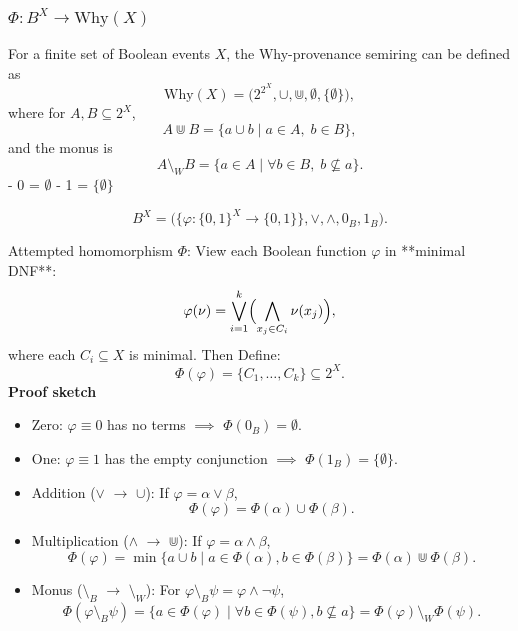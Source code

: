 \subsubsection{\(\Phi : B^X \to \mathrm{Why}(X)\)}

For a finite set of Boolean events \(X\), the Why-provenance semiring can be defined as
\[
\mathrm{Why}(X) = \bigl(2^{2^X},\cup,\Cup,\emptyset,\{\emptyset\}\bigr),
\]
where for \(A,B\subseteq 2^X\),
\[
A \Cup B = \{a \cup b \mid a\in A,\;b\in B\},
\]
and the monus is
\[
A \setminus_W B = \{a\in A\mid \forall b\in B,\;b\nsubseteq a\}.
\]
- 0 = \(\emptyset\)  
- 1 = \(\{\emptyset\}\)




 
\[
B^X = \bigl(\{\varphi:\{0,1\}^X\to\{0,1\}\},\vee,\wedge,0_B,1_B\bigr).
\]

Attempted homomorphism \(\Phi\):
View each Boolean function \(\varphi\) in **minimal DNF**:
   \[
   \varphi(\nu)
   = \bigvee_{i=1}^k \Bigl(\bigwedge_{x_j\in C_i} \nu(x_j)\Bigr),
   \]
   where each \(C_i\subseteq X\) is minimal.\newline
Then Define:
   \[
   \Phi(\varphi) = \{C_1,\dots,C_k\}\subseteq 2^X.
   \]
\textbf{Proof sketch}
\begin{itemize}
\item Zero:  
   \(\varphi\equiv 0\) has no terms $\implies$ \(\Phi(0_B)=\emptyset\).

\item One:  
   \(\varphi\equiv 1\) has the empty conjunction $\implies$ \(\Phi(1_B)=\{\emptyset\}\).

\item Addition (\(\vee\) $\rightarrow$ \(\cup\)):  
   If \(\varphi=\alpha\vee\beta\),
   \[
   \Phi(\varphi) = \Phi(\alpha)\cup\Phi(\beta).
   \]

\item Multiplication (\(\wedge\) $\rightarrow$  \(\Cup\)):  
   If \(\varphi=\alpha\wedge\beta\),
   \[
   \Phi(\varphi)
   = \min\{a\cup b\mid a\in\Phi(\alpha),b\in\Phi(\beta)\}
   = \Phi(\alpha)\Cup\Phi(\beta).
   \]

\item Monus (\(\setminus_B\) $\rightarrow$  \(\setminus_W\)):  
   For \(\varphi\setminus_B\psi = \varphi\wedge\neg\psi\),
   \[
   \Phi(\varphi\setminus_B\psi)
   = \{a\in\Phi(\varphi)\mid \forall b\in\Phi(\psi),b\nsubseteq a\}
   = \Phi(\varphi)\setminus_W\Phi(\psi).
   \]

\end{itemize}


